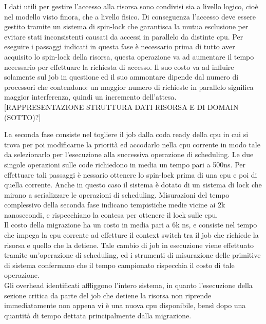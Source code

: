 \noindent I dati utili per gestire l'accesso alla risorsa sono condivisi sia a livello logico, cioè nel modello visto finora, che a livello fisico. Di conseguenza l'accesso deve essere gestito tramite un sistema di spin-lock che garantisca la mutua esclusione per evitare stati inconsistenti causati da accessi in parallelo da distinte cpu. Per eseguire i passaggi indicati in questa fase è necessario prima di tutto aver acquisito lo spin-lock della risorsa, questa operazione va ad aumentare il tempo necessario per effettuare la richiesta di accesso. Il suo costo va ad influire solamente sul job in questione ed il suo ammontare dipende dal numero di processori che contendono: un maggior numero di richieste in parallelo significa maggior interferenza, quindi un incremento dell'attesa.\\

[RAPPRESENTAZIONE STRUTTURA DATI RISORSA E DI DOMAIN (SOTTO)?]

\noindent La seconda fase consiste nel togliere il job dalla coda ready della cpu in cui si trova per poi modificarne la priorità ed accodarlo nella cpu corrente in modo tale da selezionarlo per l'esecuzione alla successiva operazione di scheduling. Le due singole operazioni sulle code richiedono in media un tempo pari a 500ns. Per effettuare tali passaggi è nessario ottenere lo spin-lock prima di una cpu e poi di quella corrente. Anche in questo caso il sistema è dotato di un sistema di lock che mirano a serializzare le operazioni di scheduling. Misurazioni del tempo complessivo della seconda fase indicano tempistiche medie vicine ai 2k nanosecondi, e rispecchiano la contesa per ottenere il lock sulle cpu.\\

\noindent Il costo della migrazione ha un costo in media pari a 6k ns, e consiste nel tempo che impega la cpu corrente ad effetture il context switch tra il job che richiede la risorsa e quello che la detiene. Tale cambio di job in esecuzione viene effettuato tramite un'operazione di scheduling, ed i strumenti di misurazione delle primitive di sistema confermano che il tempo campionato rispecchia il costo di tale operazione.\\

\noindent Gli overhead identificati affliggono l'intero sistema, in quanto l'esecuzione della sezione critica da parte del job che detiene la risorsa non riprende immediatamente non appena vi è una nuova cpu disponibile, bensì dopo una quantità di tempo dettata principalmente dalla migrazione.\\

